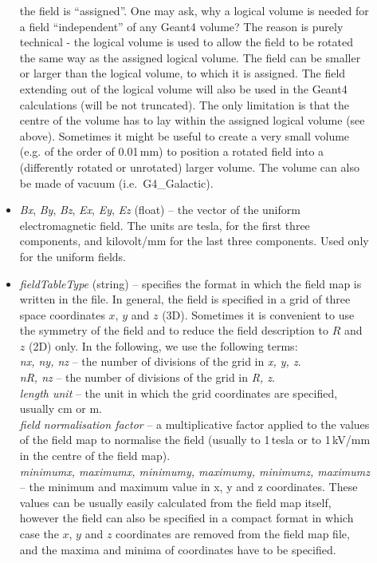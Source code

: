 \documentclass[twoside]{dis04}
\begin{document}
\begin{description}
\begin{itemize}
		the field is ``assigned''.  One may ask, why a logical volume is needed for a field
		``independent'' of any Geant4 volume?  The reason is purely technical - the
		logical volume is used to allow the field to be rotated the same way as
		the assigned logical volume. 
		The field can be smaller or larger than the logical
		volume, to which it is assigned.  
		The field extending out of the logical volume will 
		also be used in the Geant4 calculations (will be not truncated).
		The only limitation is that the centre
		of the volume has to lay within the assigned logical volume (see above).
		Sometimes it might be useful to create a very small volume (e.g. of the order of 0.01\,mm)
		to position a rotated field into a (differently rotated or unrotated) 
		larger volume.  The volume can also be made of vacuum (i.e.\ G4\_Galactic).
	   \item \emph{Bx}, \emph{By}, \emph{Bz}, \emph{Ex}, \emph{Ey}, \emph{Ez} (float) -- the vector
		of the uniform electromagnetic field.  The units are tesla, for the first three
		components, and kilovolt/mm for the last three components. 
		Used only for the uniform fields.
	   \item \emph{fieldTableType} (string) -- specifies the format in which the field map is
		written in the file.  In general, the field is specified in a grid of
		three space coordinates $x$, $y$ and $z$ (3D).
		Sometimes it is convenient to use the symmetry of the field
		and to reduce the field description to $R$ and $z$ (2D) only.  
		In the following, we use the following terms: \\
		\emph{nx, ny, nz} -- the number of divisions of the grid in
		\emph{x, y, z}.\\
		\emph{nR, nz} -- the number of divisions of the grid in \emph{R, z}.\\
		\emph{length unit} -- the unit in which the grid coordinates are specified, usually
		cm or m.\\
		\emph{field normalisation factor} -- a multiplicative factor applied to the values
		of the field map to normalise the field (usually to 1\,tesla or to 1\,kV/mm in the
		centre of the field map).\\
		\emph{minimumx, maximumx, minimumy, maximumy, minimumz, maximumz} -- the
		minimum and maximum value in x, y and z coordinates.  These values can be usually easily
		calculated from the field map itself, however the field can also be specified
		in a compact format in which case the $x$, $y$ and $z$ coordinates are removed from
		the field map file,
		and the maxima and minima of coordinates have to be specified.\\

\end{itemize}
\end{description}
\end{document}
